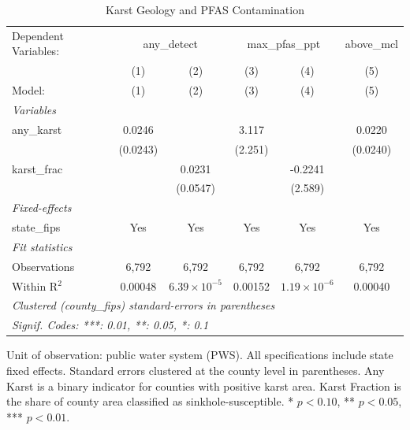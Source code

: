 
\begin{table}[htbp]
   \caption{\label{tab:main} Karst Geology and PFAS Contamination}
   \centering
   \begin{tabular}{lccccc}
      \tabularnewline \midrule \midrule
      Dependent Variables: & \multicolumn{2}{c}{any\_detect} & \multicolumn{2}{c}{max\_pfas\_ppt} & above\_mcl\\
                   & (1)      & (2)                   & (3)     & (4)                   & (5) \\   
      Model:       & (1)      & (2)                   & (3)     & (4)                   & (5)\\  
      \midrule
      \emph{Variables}\\
      any\_karst   & 0.0246   &                       & 3.117   &                       & 0.0220\\   
                   & (0.0243) &                       & (2.251) &                       & (0.0240)\\   
      karst\_frac  &          & 0.0231                &         & -0.2241               &   \\   
                   &          & (0.0547)              &         & (2.589)               &   \\   
      \midrule
      \emph{Fixed-effects}\\
      state\_fips  & Yes      & Yes                   & Yes     & Yes                   & Yes\\  
      \midrule
      \emph{Fit statistics}\\
      Observations & 6,792    & 6,792                 & 6,792   & 6,792                 & 6,792\\  
      Within R$^2$ & 0.00048  & $6.39\times 10^{-5}$  & 0.00152 & $1.19\times 10^{-6}$  & 0.00040\\  
      \midrule \midrule
      \multicolumn{6}{l}{\emph{Clustered (county\_fips) standard-errors in parentheses}}\\
      \multicolumn{6}{l}{\emph{Signif. Codes: ***: 0.01, **: 0.05, *: 0.1}}\\
   \end{tabular}
   
   \par \raggedright 
   Unit of observation: public water system (PWS). All specifications include state fixed effects. Standard errors clustered at the county level in parentheses. Any Karst is a binary indicator for counties with positive karst area. Karst Fraction is the share of county area classified as sinkhole-susceptible. * $p<0.10$, ** $p<0.05$, *** $p<0.01$.
\end{table}



